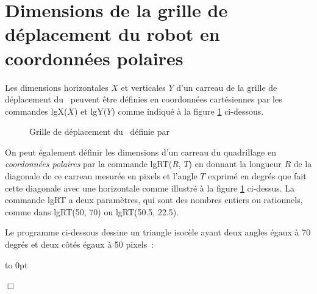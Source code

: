\section{Dimensions de la grille de déplacement du robot en coordonnées polaires}
Les dimensions horizontales $X$ et verticales $Y$ d'un carreau de la grille de dé\-pla\-ce\-ment du
\robot\ peuvent être définies en coordonnées cartésiennes par les commandes
{\idt lgX(}$X${\idt )} et {\idt lgY(}$Y${\idt )} comme indiqué à la figure \ref{fig:lgrt} ci-dessous.

\begin{figure}[h]
 \parbox{13.7cm}{\caption{Grille de déplacement du \protect\robot\ définie par}\label{fig:lgrt}} 
\end{figure}

On peut également définir les dimensions d'un carreau du quadrillage en {\em coordonnées
polaires} par la commande
{\idt lgRT(}$R${\idt ,} $T${\idt )} en donnant la longueur $R$ de la diagonale de ce carreau mesurée
en pixels et
l'angle $T$  exprimé en degrés que fait cette diagonale avec une horizontale
comme illustré à la figure \ref{fig:lgrt} ci-dessus. La commande {\idt lgRT} a deux
paramètres, qui sont des nombres entiers ou rationnels, comme dans {\idt lgRT(50, 70)} ou
{\idt lgRT(50.5, 22.5)}.

\begin{exemple}{\rm
Le programme ci-dessous dessine un triangle isocèle ayant deux angles égaux
à 70 degrés et deux côtés égaux à 50 pixels~:

{\raggedright 
 \vbox to 0pt{}%
 
 }
\noindent $\Box$ }
\end{exemple}

